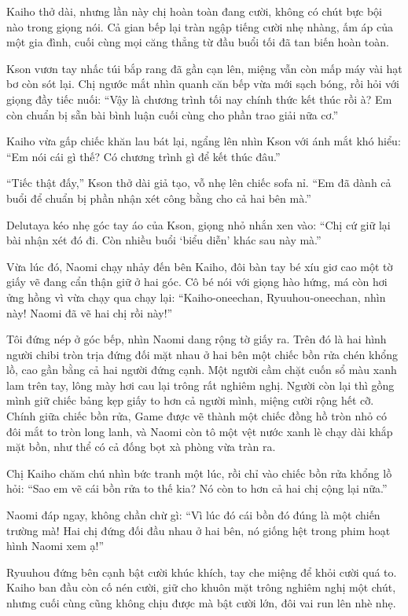 \documentclass[../main.tex]{subfiles}
\begin{document}
Kaiho thở dài, nhưng lần này chị hoàn toàn đang cười, không có chút bực bội nào trong giọng nói. Cả gian bếp lại tràn ngập tiếng cười nhẹ nhàng, ấm áp của một gia đình, cuối cùng mọi căng thẳng từ đầu buổi tối đã tan biến hoàn toàn.

\ct

Kson vươn tay nhấc túi bắp rang đã gần cạn lên, miệng vẫn còn mấp máy vài hạt bơ còn sót lại. Chị ngước mắt nhìn quanh căn bếp vừa mới sạch bóng, rồi hỏi với giọng đầy tiếc nuối: ``Vậy là chương trình tối nay chính thức kết thúc rồi à? Em còn chuẩn bị sẵn bài bình luận cuối cùng cho phần trao giải nữa cơ.''

Kaiho vừa gấp chiếc khăn lau bát lại, ngẩng lên nhìn Kson với ánh mắt khó hiểu: ``Em nói cái gì thế? Có chương trình gì để kết thúc đâu.''

``Tiếc thật đấy,'' Kson thở dài giả tạo, vỗ nhẹ lên chiếc sofa nỉ. ``Em đã dành cả buổi để chuẩn bị phần nhận xét công bằng cho cả hai bên mà.''

Delutaya kéo nhẹ góc tay áo của Kson, giọng nhỏ nhắn xen vào:
``Chị cứ giữ lại bài nhận xét đó đi. Còn nhiều buổi `biểu diễn' khác sau này mà.''

Vừa lúc đó, Naomi chạy nhảy đến bên Kaiho, đôi bàn tay bé xíu giơ cao một tờ giấy vẽ đang cẩn thận giữ ở hai góc. Cô bé nói với giọng hào hứng, má còn hơi ửng hồng vì vừa chạy qua chạy lại:
``Kaiho-oneechan, Ryuuhou-oneechan, nhìn này! Naomi đã vẽ hai chị rồi này!''

Tôi đứng nép ở góc bếp, nhìn Naomi dang rộng tờ giấy ra. Trên đó là hai hình người chibi tròn trịa đứng đối mặt nhau ở hai bên một chiếc bồn rửa chén khổng lồ, cao gần bằng cả hai người đứng cạnh. Một người cầm chặt cuốn sổ màu xanh lam trên tay, lông mày hơi cau lại trông rất nghiêm nghị. Người còn lại thì gồng mình giữ chiếc bảng kẹp giấy to hơn cả người mình, miệng cười rộng hết cỡ. Chính giữa chiếc bồn rửa, Game được vẽ thành một chiếc đồng hồ tròn nhỏ có đôi mắt to tròn long lanh, và Naomi còn tô một vệt nước xanh lè chạy dài khắp mặt bồn, như thể có cả đống bọt xà phòng vừa tràn ra.

Chị Kaiho chăm chú nhìn bức tranh một lúc, rồi chỉ vào chiếc bồn rửa khổng lồ hỏi: ``Sao em vẽ cái bồn rửa to thế kia? Nó còn to hơn cả hai chị cộng lại nữa.''

Naomi đáp ngay, không chần chừ gì: ``Vì lúc đó cái bồn đó đúng là một chiến trường mà! Hai chị đứng đối đầu nhau ở hai bên, nó giống hệt trong phim hoạt hình Naomi xem ạ!''

Ryuuhou đứng bên cạnh bật cười khúc khích, tay che miệng để khỏi cười quá to. Kaiho ban đầu còn cố nén cười, giữ cho khuôn mặt trông nghiêm nghị một chút, nhưng cuối cùng cũng không chịu được mà bật cười lớn, đôi vai run lên nhè nhẹ.
\end{document}
